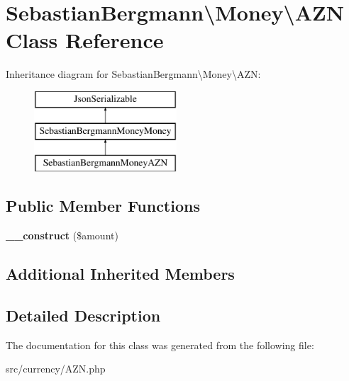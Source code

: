 \hypertarget{classSebastianBergmann_1_1Money_1_1AZN}{}\section{Sebastian\+Bergmann\textbackslash{}Money\textbackslash{}A\+Z\+N Class Reference}
\label{classSebastianBergmann_1_1Money_1_1AZN}
Inheritance diagram for Sebastian\+Bergmann\textbackslash{}Money\textbackslash{}A\+Z\+N\+:\begin{figure}[H]
\begin{center}
\leavevmode
\includegraphics[height=3.000000cm]{classSebastianBergmann_1_1Money_1_1AZN}
\end{center}
\end{figure}
\subsection*{Public Member Functions}
\begin{DoxyCompactItemize}
\item 
\hypertarget{classSebastianBergmann_1_1Money_1_1AZN_a0c4c9ad30bea9c92653325bb67e9a6d7}{}{\bfseries \+\_\+\+\_\+construct} (\$amount)\label{classSebastianBergmann_1_1Money_1_1AZN_a0c4c9ad30bea9c92653325bb67e9a6d7}

\end{DoxyCompactItemize}
\subsection*{Additional Inherited Members}


\subsection{Detailed Description}


The documentation for this class was generated from the following file\+:\begin{DoxyCompactItemize}
\item 
src/currency/A\+Z\+N.\+php\end{DoxyCompactItemize}
